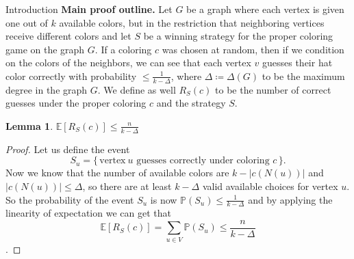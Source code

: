\documentclass[11pt, letterpaper]{article}
\theoremstyle{plain}
\theoremstyle{plain}
\newtheorem{lemma}[theorem]{Lemma}
\begin{document}
\begin{section}{Introduction}
\textbf{Main proof outline.} Let $G$ be a graph where each vertex is given one out  of $k$ available colors, but in the restriction that neighboring vertices receive different colors and let $S$ be a winning strategy for the proper coloring game on the graph $G$. If a coloring $c$ was chosen at random, then if we condition on the colors of the neighbors, we can see that each vertex $v$ guesses their hat color correctly with probability $ \leq \frac{1}{k-\Delta}$, where $\Delta \coloneqq \Delta(G)$ to be the maximum degree in the graph $G$. We define as well $R_{S}(c)$ to be the number of correct guesses under the proper coloring $c$ and the strategy $S$.
\begin{lemma}\label{lem:exp_Delta}
$\mathbb{E}[R_S(c)] \leq \frac{n}{k-\Delta}$
\end{lemma}
\begin{proof}
Let us define the event \[
S_u = \{\, \text{vertex}\  u \text{ guesses correctly under coloring } c \,\}.
\] Now we know that the number of available colors are $k - |c(N(u))|$ and $|c(N(u))| \leq \Delta$, so there are at least $k-\Delta$ valid available choices for vertex $u$. So the probability of the event $S_{u}$ is now $\mathbb{P}(S_{u}) \leq \frac{1}{k-\Delta}$ and by applying the linearity of expectation we can get that 
$$\mathbb{E}[R_{S}(c)] = \sum_{u \in V} \mathbb{P}(S_{u}) \leq \frac{n}{k-\Delta}$$.
\end{proof}
\end{section}
\end{document}
